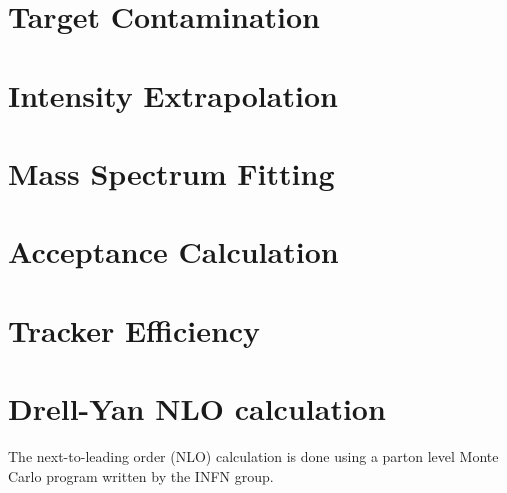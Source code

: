 \documentclass[../main.tex]{subfiles}
\begin{document}
\section{Target Contamination}

\section{Intensity Extrapolation}
\label{sec:extrapolation}

\section{Mass Spectrum Fitting}

\section{Acceptance Calculation}

\section{Tracker Efficiency}

\section{Drell-Yan NLO calculation}
The next-to-leading order (NLO) calculation is done using a parton level Monte
Carlo program written by the INFN group\cite{catani2009,catani2007}.

\ifSubfilesClassLoaded{ \printbibliography[heading=bibintoc,title={References}]}{}
\end{document}
